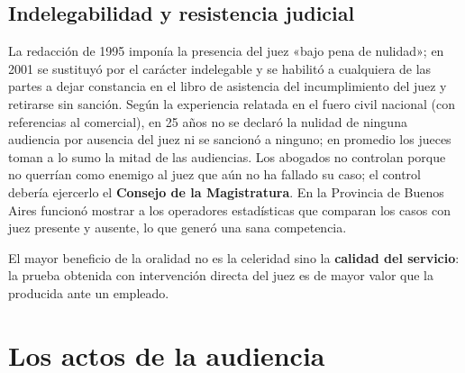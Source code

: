 \documentclass[12pt,oneside]{book}
\begin{document}

\subsection{Indelegabilidad y resistencia judicial}

La redacción de 1995 imponía la presencia del juez «bajo pena de nulidad»; en 2001 se sustituyó por el carácter indelegable y se habilitó a cualquiera de las partes a dejar constancia en el libro de asistencia del incumplimiento del juez y retirarse sin sanción. %
Según la experiencia relatada en el fuero civil nacional (con referencias al comercial), en 25 años no se declaró la nulidad de ninguna audiencia por ausencia del juez ni se sancionó a ninguno; en promedio los jueces toman a lo sumo la mitad de las audiencias. Los abogados no controlan porque no querrían como enemigo al juez que aún no ha fallado su caso; el control debería ejercerlo el \textbf{Consejo de la Magistratura}. En la Provincia de Buenos Aires funcionó mostrar a los operadores estadísticas que comparan los casos con juez presente y ausente, lo que generó una sana competencia.

\begin{importante}
El mayor beneficio de la oralidad no es la celeridad sino la \textbf{calidad del servicio}: la prueba obtenida con intervención directa del juez es de mayor valor que la producida ante un empleado.
\end{importante}

\section{Los actos de la audiencia}
\end{document}

